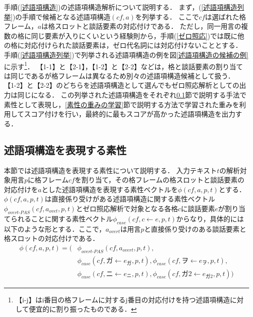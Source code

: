 \documentclass[japanese]{jnlp_1.4}
\begin{document}
手順(\ref{述語項構造})の述語項構造解析について説明する．
まず，(\ref{述語項構造列挙})の手順で候補となる述語項構造$(cf,a)$を列挙する．
ここで$cf$は選ばれた格フレーム，$a$は格スロットと談話要素の対応付けである．
ただし，同一用言の複数の格に同じ要素が入りにくいという経験則\cite{199787}から，手順(\ref{ゼロ照応})では既に他の格に対応付けられた談話要素は，ゼロ代名詞には対応付けないこととする．
手順(\ref{述語項構造列挙})で列挙される述語項構造の例を図\ref{述語項構造の候補の例}に示す\footnote{【i-j】はi番目の格フレームに対するj番目の対応付けを持つ述語項構造に対して便宜的に割り振ったものである．}．
【1-1】と【2-1】，【1-2】と【2-2】などは，格と談話要素の割り当ては同じであるが格フレームは異なるため別々の述語項構造候補として扱う．
【1-2】と【2-2】のどちらを述語項構造として選んでもゼロ照応解析としての出力は同じになる．
この列挙された述語項構造をそれぞれ\ref{述語項構造を表現する素性}節で説明する手法で素性として表現し，\ref{素性の重みの学習}節で説明する方法で学習された重みを利用してスコア付けを行い，最終的に最もスコアが高かった述語項構造を出力する．







\subsection{述語項構造を表現する素性}
\label{述語項構造を表現する素性}

本節では述語項構造を表現する素性について説明する．
入力テキスト$t$の解析対象用言$p$に格フレーム$cf$を割り当て，その格フレームの格スロットと談話要素の対応付けを$a$とした述語項構造を表現する素性ベクトルを$\phi(\mathit{cf},a,p,t)$とする．
$\phi(\mathit{cf},a,p,t)$は直接係り受けがある述語項構造に関する素性ベクトル$\phi_{\textit{overt-PAS}}(\mathit{cf},a_\mathit{ovet},p,t)$とゼロ照応解析で対象となる各格$c$に談話要素$e$が割り当てられることに関する素性ベクトル$\phi_\mathit{case}(\mathit{cf},c \leftarrow e,p,t)$からなり，具体的には以下のような形とする．ここで，$a_\mathit{overt}$は用言$p$と直接係り受けのある談話要素と格スロットの対応付けである．
\begin{equation}
\begin{split}
 \phi(\mathit{cf},a,p,t) = (& \phi_{\textit{overt-PAS}}(\mathit{cf},a_\mathit{overt},p,t), \\
  & \phi_\mathit{case}(\mathit{cf},ガ \leftarrow e_{ガ},p,t),\phi_\mathit{case}(\mathit{cf},ヲ \leftarrow e_{ヲ},p,t),\\
  & \phi_\mathit{case}(\mathit{cf},ニ \leftarrow e_{ニ},p,t),\phi_\mathit{case}(\mathit{cf},ガ 2 \leftarrow e_{ガ 2},p,t))
\end{split}
\end{equation}
\end{document}
